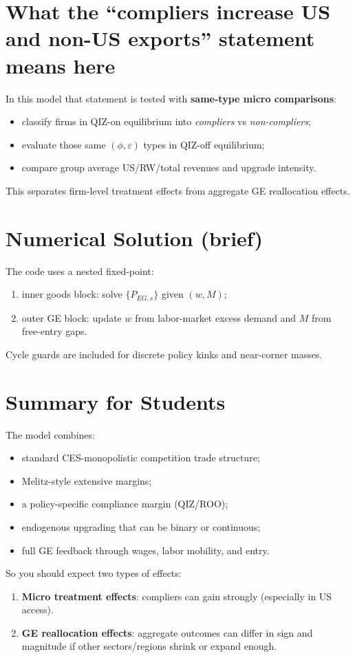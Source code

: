 \documentclass[11pt]{article}
\begin{document}
\section{What the ``compliers increase US and non-US exports'' statement means here}
In this model that statement is tested with \textbf{same-type micro comparisons}:
\begin{itemize}
    \item classify firms in QIZ-on equilibrium into \emph{compliers} vs \emph{non-compliers};
    \item evaluate those same $(\phi,\varepsilon)$ types in QIZ-off equilibrium;
    \item compare group average US/RW/total revenues and upgrade intensity.
\end{itemize}
This separates firm-level treatment effects from aggregate GE reallocation effects.

\section{Numerical Solution (brief)}
The code uses a nested fixed-point:
\begin{enumerate}
    \item inner goods block: solve $\{P_{EG,s}\}$ given $(w,M)$;
    \item outer GE block: update $w$ from labor-market excess demand and $M$ from free-entry gaps.
\end{enumerate}
Cycle guards are included for discrete policy kinks and near-corner masses.

\section{Summary for Students}
The model combines:
\begin{itemize}
    \item standard CES-monopolistic competition trade structure;
    \item Melitz-style extensive margins;
    \item a policy-specific compliance margin (QIZ/ROO);
    \item endogenous upgrading that can be binary or continuous;
    \item full GE feedback through wages, labor mobility, and entry.
\end{itemize}

So you should expect two types of effects:
\begin{enumerate}
    \item \textbf{Micro treatment effects}: compliers can gain strongly (especially in US access).
    \item \textbf{GE reallocation effects}: aggregate outcomes can differ in sign and magnitude if other sectors/regions shrink or expand enough.
\end{enumerate}
\end{document}
